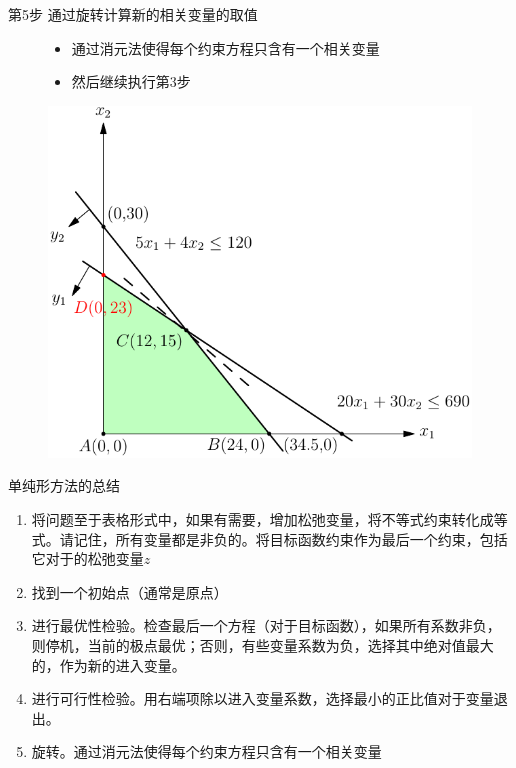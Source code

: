 \documentclass[UTF8]{ctexbeamer}
\begin{document}
\begin{frame}{第5步 通过旋转计算新的相关变量的取值}
  \begin{figure}
    \begin{minipage}{.5\linewidth}
      \begin{itemize}
      \item 通过消元法使得每个约束方程只含有一个相关变量
      \item 然后继续执行第3步
      \end{itemize}
    \end{minipage}%
    \begin{minipage}{.5\linewidth}
      \includegraphics[width=\textwidth{}]{simplex-rotate.pdf}
    \end{minipage}
  \end{figure}  
\end{frame}

\begin{frame}{单纯形方法的总结}
  \begin{enumerate}
  \item 将问题至于表格形式中，如果有需要，增加松弛变量，将不等式约束转化成等式。请记住，所有变量都是非负的。将目标函数约束作为最后一个约束，包括它对于的松弛变量$z$
  \item 找到一个初始点（通常是原点）
  \item 进行最优性检验。检查最后一个方程（对于目标函数），如果所有系数非负，则停机，当前的极点最优；否则，有些变量系数为负，选择其中绝对值最大的，作为新的进入变量。
  \item 进行可行性检验。用右端项除以进入变量系数，选择最小的正比值对于变量退出。
  \item 旋转。通过消元法使得每个约束方程只含有一个相关变量
  \end{enumerate}
\end{frame}
\end{document}
